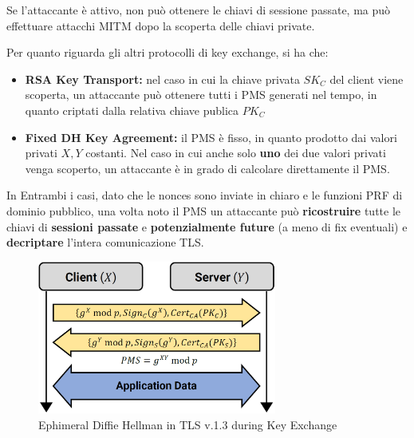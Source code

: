 \begin{remark}
Se l'attaccante è attivo, non può ottenere le chiavi di sessione passate, ma può effettuare attacchi MITM dopo la scoperta delle chiavi private.
\end{remark}
Per quanto riguarda gli altri protocolli di key exchange, si ha che:
\begin{itemize}
    \item \textbf{RSA Key Transport:} nel caso in cui la chiave privata $SK_C$ del client viene scoperta, un attaccante può ottenere tutti i PMS generati nel tempo, in quanto criptati dalla relativa chiave publica $PK_C$
    \item \textbf{Fixed DH Key Agreement:} il PMS è fisso, in quanto prodotto dai valori privati $X,Y$ costanti. Nel caso in cui anche solo \textbf{uno} dei due valori privati venga scoperto, un attaccante è in grado di calcolare direttamente il PMS.
\end{itemize}
In Entrambi i casi, dato che le nonces sono inviate in chiaro e le funzioni PRF di dominio pubblico, una volta noto il PMS un attaccante può \textbf{ricostruire} tutte le chiavi di \textbf{sessioni passate} e \textbf{potenzialmente future} (a meno di fix eventuali) e \textbf{decriptare} l'intera comunicazione TLS.
\begin{figure}[h]
    \centering
    \includegraphics[width=0.7\textwidth]{image/ephdh.png}
    \caption{Ephimeral Diffie Hellman in TLS v.1.3 during Key Exchange}
    \label{fig:ephdh}
\end{figure}\pagebreak
